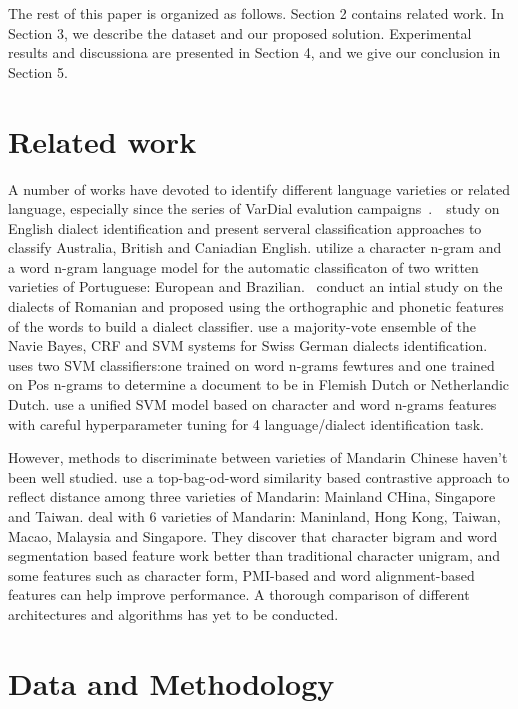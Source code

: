 \documentclass[11pt,a4paper]{article}
\begin{document}
The rest of this paper is organized as follows. Section 2 contains related work.  In Section 3, we describe the dataset and our proposed solution. Experimental results and discussiona are presented in Section 4, and we give our conclusion in Section 5.
\section{Related work\label{related work}}
A number of works have devoted to identify different language varieties or related language, especially since the series of VarDial evalution campaigns~\cite{W16-4801, W17-1201, W18-3901}.~\cite{U13-1003}~study on English dialect identification and present serveral classification approaches to classify Australia, British and Caniadian English. \cite{Zampieri2012AutomaticIO} utilize a character n-gram and a word n-gram language model for the automatic classificaton of two written varieties of Portuguese: European and Brazilian. \cite{Ciobanu2016ACP}~conduct an intial study on the dialects of Romanian and proposed using the orthographic and phonetic features of the words to build a dialect classifier. \cite{W17-1221} use a majority-vote ensemble of the Navie Bayes, CRF and SVM systems for Swiss German dialects identification. \cite{W18-3922} uses two SVM classifiers:one trained on word n-grams fewtures and one trained on Pos n-grams to determine a document to be in Flemish Dutch or Netherlandic Dutch. \cite{W18-3906} use a unified SVM model based on character and word n-grams features with careful hyperparameter tuning for 4 language/dialect identification task.

However, methods to discriminate between varieties of Mandarin Chinese haven't been well studied. \cite{Y08-1042} use a top-bag-od-word similarity based contrastive approach to reflect distance among three varieties of Mandarin: Mainland CHina, Singapore and Taiwan. \cite{IJNLC2016:5} deal with 6 varieties of Mandarin: Maninland, Hong Kong, Taiwan, Macao, Malaysia and Singapore. They discover that character bigram and word segmentation based feature work better than traditional character unigram, and some features such as character form, PMI-based and word alignment-based features can help improve performance. A thorough comparison of different architectures and algorithms has yet to be conducted.
\section{Data and Methodology\label{data and methodlogy}}
\end{document}

